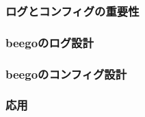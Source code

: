 \subsubsection{ログとコンフィグの重要性}

\subsubsection{beegoのログ設計}

\subsubsection{beegoのコンフィグ設計}

\subsubsection{応用}

